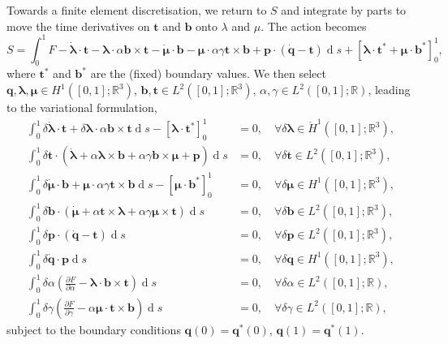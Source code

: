 \documentclass{article}
\def\MM#1{\boldsymbol{#1}}
\newcommand{\pp}[2]{\frac{\partial #1}{\partial #2}}
\def\MM#1{\boldsymbol{#1}}
\DeclareMathOperator{\diff}{d}
\begin{document}
Towards a finite element discretisation, we return to $S$ and integrate
by parts to move the time derivatives on $\MM{t}$ and $\MM{b}$ onto
$\lambda$ and $\mu$. The action becomes
\begin{equation}
  S = \int_0^1 F - \dot{\MM{\lambda}}\cdot\MM{t}
  -\MM{\lambda}\cdot\alpha\MM{b}\times\MM{t}
  - \dot{\MM{\mu}}\cdot\MM{b}
  -\MM{\mu}\cdot\alpha\gamma\MM{t}\times\MM{b}
  + \MM{p}\cdot\left(\dot{\MM{q}}-\MM{t}\right)\diff s
  + \left[\MM{\lambda}\cdot\MM{t}^* + \MM{\mu}\cdot\MM{b}^*
    \right]_0^1,
\end{equation}
where $\MM{t}^*$ and $\MM{b}^*$ are the (fixed) boundary values. We
then select $\MM{q},\MM{\lambda},\MM{\mu}\in H^1([0,1];\mathbb{R}^3)$,
$\MM{b},\MM{t}\in L^2([0,1];\mathbb{R}^3)$, $\alpha,\gamma\in
L^2([0,1];\mathbb{R})$, leading to the variational formulation,
\begin{align}
  \int_0^1 \delta \dot{\MM{\lambda}}\cdot\MM{t}
  +\delta\MM{\lambda}\cdot\alpha\MM{b}\times\MM{t}
  \diff s -
  \left[
    \MM{\lambda}\cdot \MM{t}^*
    \right]_0^1
  & = 0, \quad \forall \delta\MM{\lambda} \in
  \mathring{H}^1([0,1];\mathbb{R}^3), \\
  \int_0^1 \delta \MM{t} \cdot
  \left(\dot{\MM{\lambda}} + \alpha\MM{\lambda}\times \MM{b}
  +\alpha\gamma \MM{b}\times\MM{\mu} + \MM{p}\right)\diff s & = 0,
  \quad \forall \delta\MM{t} \in L^2([0,1];\mathbb{R}^3), \\
  \int_0^1 \delta \dot{\MM{\mu}}\cdot{\MM{b}}
  +\MM{\mu}\cdot\alpha\gamma\MM{t}\times\MM{b}
  \diff s - \left[\MM{\mu}\cdot\MM{b}^*
    \right]_0^1& = 0, \quad \forall \delta\MM{\mu} \in
  H^1([0,1];\mathbb{R}^3), \\
  \int_0^1 \delta \MM{b}\cdot \left(\dot{\MM{\mu}}
  +\alpha\MM{t}\times\MM{\lambda}
  +\alpha\gamma\MM{\mu}\times\MM{t}
  \right)\diff s & = 0, \quad \forall \delta\MM{b}\in L^2([0,1];\mathbb{R}^3), \\
  \int_0^1 \delta \MM{p}\cdot \left(\dot{\MM{q}}-\MM{t}\right)\diff s &= 0,
  \quad \forall \delta\MM{p}\in L^2([0,1];\mathbb{R}^3), \\
  \int_0^1 \delta\dot{\MM{q}}\cdot{\MM{p}}\diff s & = 0, \quad
  \forall \delta \MM{q} \in H^1([0,1];\mathbb{R}^3), \\
  \int_0^1 \delta\alpha\left(\pp{F}{\alpha}-\MM{\lambda}\cdot\MM{b}\times
  \MM{t}\right)\diff s & = 0, \quad \forall \delta\alpha\in L^2([0,1];
  \mathbb{R}), \\
  \int_0^1 \delta\gamma\left(\pp{F}{\gamma}-\alpha\MM{\mu}\cdot\MM{t}\times
  \MM{b}\right)\diff s & = 0, \quad \forall \delta\gamma \in L^2([0,1];
  \mathbb{R}),
\end{align}
subject to the boundary conditions $\MM{q}(0)=\MM{q}^*(0)$,
$\MM{q}(1)=\MM{q}^*(1)$.
\end{document}
